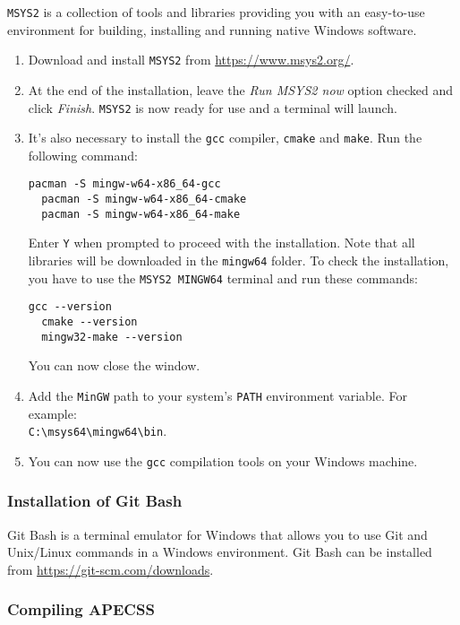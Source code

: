 {\tt MSYS2} is a collection of tools and libraries providing you with an easy-to-use environment for building, installing and running native Windows software.
\vspace{-1em}
\begin{enumerate}[noitemsep]
  \item Download and install {\tt MSYS2} from \url{https://www.msys2.org/}.
  \item At the end of the installation, leave the {\it Run MSYS2 now} option checked and click {\it Finish}. {\tt MSYS2} is now ready for use and a terminal will launch.
  \item It's also necessary to install the {\tt gcc} compiler, {\tt cmake} and {\tt make}. Run the following command:
  \begin{lstlisting}[style=CStyle,numbers=none]
  pacman -S mingw-w64-x86_64-gcc
  pacman -S mingw-w64-x86_64-cmake
  pacman -S mingw-w64-x86_64-make
\end{lstlisting}
Enter {\tt Y} when prompted to proceed with the installation. Note that all libraries will be downloaded in the {\tt mingw64} folder. To check the installation, you have to use the {\tt MSYS2 MINGW64} terminal and run these commands:
\begin{lstlisting}[style=CStyle,numbers=none]
  gcc --version
  cmake --version
  mingw32-make --version\end{lstlisting}
You can now close the window.
\item Add the {\tt MinGW} path to your system's {\tt PATH} environment variable. For example: \\{\tt C:\textbackslash msys64\textbackslash mingw64\textbackslash bin}.
\item  You can now use the {\tt gcc} compilation tools on your Windows machine.
\end{enumerate}

\subsubsection*{Installation of Git Bash}

Git Bash is a terminal emulator for Windows that allows you to use Git and Unix/Linux commands in a Windows environment. Git Bash can be installed from \url{https://git-scm.com/downloads}.

\subsubsection*{Compiling APECSS}

